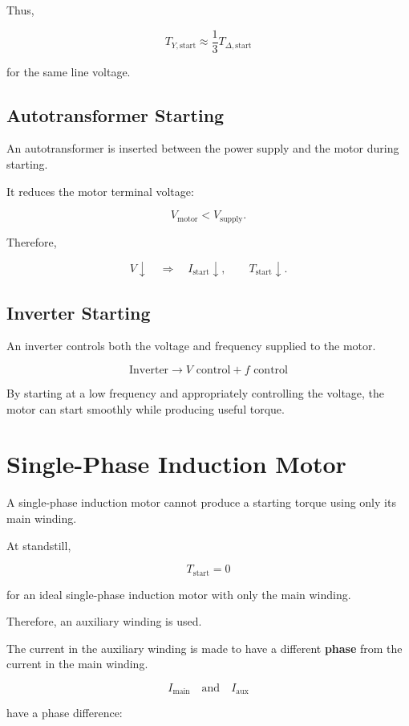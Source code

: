 \documentclass[a4paper,11pt]{article}
\begin{document}
Thus,

\[
\boxed{
T_{Y,\mathrm{start}}
\approx
\frac{1}{3}
T_{\Delta,\mathrm{start}}
}
\]

for the same line voltage.

\subsection{Autotransformer Starting}

An autotransformer is inserted between the power supply and the motor
during starting.

It reduces the motor terminal voltage:

\[
V_{\mathrm{motor}} < V_{\mathrm{supply}}.
\]

Therefore,

\[
V \downarrow
\quad\Rightarrow\quad
I_{\mathrm{start}} \downarrow,
\qquad
T_{\mathrm{start}} \downarrow.
\]

\subsection{Inverter Starting}

An inverter controls both the voltage and frequency supplied to the
motor.

\[
\boxed{
\text{Inverter}
\rightarrow
V \text{ control} + f \text{ control}
}
\]

By starting at a low frequency and appropriately controlling the
voltage, the motor can start smoothly while producing useful torque.

\section{Single-Phase Induction Motor}

A single-phase induction motor cannot produce a starting torque using
only its main winding.

At standstill,

\[
\boxed{T_{\mathrm{start}}=0}
\]

for an ideal single-phase induction motor with only the main winding.

Therefore, an auxiliary winding is used.

The current in the auxiliary winding is made to have a different
\textbf{phase} from the current in the main winding.

\[
I_{\mathrm{main}}
\quad\text{and}\quad
I_{\mathrm{aux}}
\]

have a phase difference:
\end{document}
